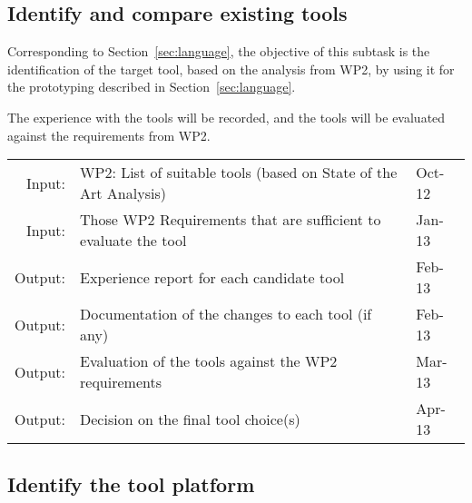 \documentclass[11pt, a4paper]{article}
\let\oldmarginpar\marginpar
\renewcommand\marginpar[1]{\-\oldmarginpar[\raggedleft\scriptsize #1]%
{\raggedright\scriptsize #1}}
\newenvironment{inoutput}
{\vspace{2mm}
\noindent
\begin{tabular}{|r|p{.7\linewidth}|l|}
\hline}
{
\hline
\end{tabular}}
\begin{document}
\subsection{Identify and compare existing tools}
\label{sec:tool}

Corresponding to Section~\ref{sec:language}, the objective of this subtask is the identification of the target tool, based on the analysis from WP2, by using it for the prototyping described in Section~\ref{sec:language}.

The experience with the tools will be recorded, and the tools will be evaluated against the requirements from WP2.

\begin{inoutput}
Input: & WP2: List of suitable tools (based on State of the Art Analysis) & Oct-12 \\
Input: & Those WP2 Requirements that are sufficient to evaluate the tool & Jan-13 \\
\hline
Output: & Experience report for each candidate tool & Feb-13 \\
Output: & Documentation of the changes to each tool (if any) & Feb-13 \\
Output: & Evaluation of the tools against the WP2 requirements & Mar-13 \\
Output: & Decision on the final tool choice(s) & Apr-13 \\
\end{inoutput}

\subsection{Identify the tool platform}
\label{sec:tool_platform}
\end{document}
